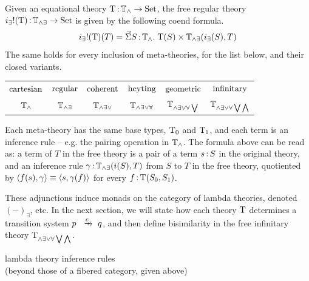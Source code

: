 \documentclass{article}
\begin{document}
\begin{proposition}
Given an equational theory $\mathrm{T}\,{:}\, \mathbb{T}_\land\to \mathrm{Set}$, the free regular theory $i_\exists !(\mathrm{T})\,{:}\, \mathbb{T}_{\land\exists}\to \mathrm{Set}$ is given by the following coend formula.
\[i_\exists !(\mathrm{T})(T) = \vec{\Sigma} S\,{:}\, \mathbb{T}_\land.\; \mathrm{T}(S)\times \mathbb{T}_{\land\exists}(i_\exists(S),T)\]
The same holds for every inclusion of meta-theories, for the list below, and their closed variants.
\begin{center}
    \renewcommand{\arraystretch}{1.2}
    \begin{tabular}{cccccc}
        $\mathrm{cartesian}$ & $\mathrm{regular}$ & $\mathrm{coherent}$ & $\mathrm{heyting}$ & $\mathrm{geometric}$ & $\mathrm{infinitary}$\\
         $\mathbb{T}_\land$ & $\mathbb{T}_{\land\exists}$ & $\mathbb{T}_{\land\exists\lor}$ & $\mathbb{T}_{\land\exists\lor\forall}$ & $\mathbb{T}_{\land\exists\lor\forall\bigvee}$ & $\mathbb{T}_{\land\exists\lor\forall\bigvee\bigwedge}$
    \end{tabular}
\end{center}
\end{proposition}

Each meta-theory has the same base types, $\mathrm{T}_0$ and $\mathrm{T}_1$, and each term is an inference rule -- e.g. the pairing operation in $\mathbb{T}_\land$. The formula above can be read as: a term of $T$ in the free theory is a pair of a term $s\,{:}\, S$ in the original theory, and an inference rule $\gamma\,{:}\, \mathbb{T}_{\land\exists}(i(S),T)$ from $S$ to $T$ in the free theory, quotiented by $\langle f(s),\gamma\rangle \equiv \langle s,\gamma(f)\rangle$ for every $f\,{:}\, \mathrm{T}(S_0,S_1)$.

These adjunctions induce monads on the category of lambda theories, denoted $(-)_\exists$, etc. In the next section, we will state how each theory $\mathrm{T}$ determines a transition system $p\xr{c} q$, and then define bisimilarity in the free infinitary theory $\mathrm{T}_{\land\exists\lor\forall\bigvee\bigwedge}$.

\newpage

\begin{center}
    lambda theory inference rules\\
    (beyond those of a fibered category, given above)
\end{center}
\end{document}
